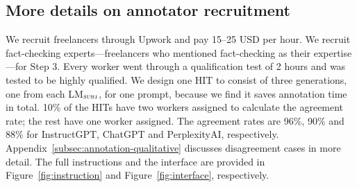\documentclass[11pt]{article}
\newcommand{\subjectLM}{LM$_\textsc{subj}$}
\begin{document}
\subsection{More details on annotator recruitment}\label{app:annotator-recruitment}
We recruit freelancers through Upwork and pay 15--25 USD per hour. We recruit fact-checking experts---freelancers who mentioned fact-checking as their expertise---for Step 3.
Every worker went through a qualification test of 2 hours and was tested to be highly qualified.
We design one HIT to consist of three generations, one from each \subjectLM, for one prompt, because we find it saves annotation time in total.
10\% of the HITs have two workers assigned to calculate the agreement rate; the rest have one worker assigned.
The agreement rates are 96\%, 90\% and 88\% for InstructGPT, ChatGPT and PerplexityAI, respectively. Appendix~\ref{subsec:annotation-qualitative} discusses disagreement cases in more detail.
The full instructions and the interface are provided in Figure~\ref{fig:instruction} and Figure~\ref{fig:interface}, respectively.

\end{document}
